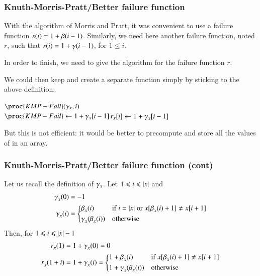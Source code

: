%
\begin{frame}
\frametitle{Knuth-Morris-Pratt/Better failure function}

With the algorithm of Morris and Pratt, it was convenient to use a
failure function \(s(i) = 1 + \beta(i-1)\). Similarly, we need
here another failure function, noted \(r\), such that \(r(i) = 1 +
\gamma(i-1)\), for \(1 \leqslant i\).

\bigskip

In order to finish, we need to give the algorithm for the failure
function \(r\).

\bigskip

We could then keep  and create a separate function
 simply by sticking to the above definition:
\begin{codebox}
\(\proc{KMP-Fail} (\KMPsupplyName_{x}, i)\)\\
\li \(\proc{KMP-Fail} \gets 1 + \KMPsupplyName_{x}[i-1]\)\RComment \(r_{x}[i] \gets 1 + \gamma_{x}[i-1]\)
\end{codebox}
But this is not efficient: it would be better to precompute
and store all the values of  in an array.

\end{frame}

%
\begin{frame}
\frametitle{Knuth-Morris-Pratt/Better failure function (cont)}

Let us recall the definition of \(\gamma_{x}\). Let \(1
\leqslant i \leqslant \lvert{x}\lvert{}\) and
\begin{align*}
\gamma_{x}^{}(0) &= -1\\
  \gamma_{x}^{}(i)
&= \left\lbrace
  \begin{aligned}
    &  \beta_{x}^{}(i)
    && \text{if} \; i = \lvert{x}\lvert{} \; \text{or}
       \; x [\beta_{x}^{}(i) + 1] \neq x [i + 1]\\
    &  \gamma_{x}^{}(\beta_{x}^{}(i))
    && \text{otherwise}
  \end{aligned}
  \right.
\end{align*}
Then, for \(1 \leqslant i \leqslant \lvert{x}\lvert{}-1\)
\begin{align*}
   r_{x}^{}(1)
&= 1 + \gamma_{x}^{}(0) = 0\\
   r_{x}^{}(1+i)
&= 1 + \gamma_{x}^{}(i)
 = \left\lbrace
   \begin{aligned}
   & 1 + \beta_{x}^{}(i)
   && \text{if} \; x [\beta_{x}^{}(i) + 1] \neq x [i + 1]\\
   & 1 + \gamma_{x}^{}(\beta_{x}^{}(i))
   && \text{otherwise}
   \end{aligned}
   \right.
\end{align*}

\end{frame}

